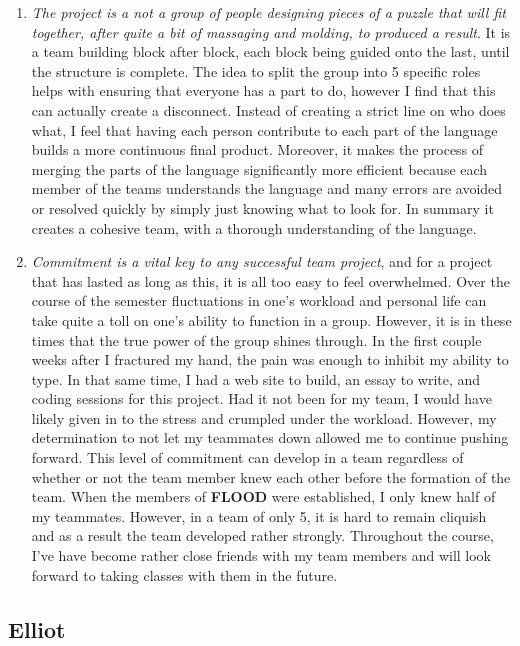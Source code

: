 \documentclass[12pt]{report}
\begin{document}
\begin{enumerate}
\item \textit{The project is a not a group of people designing pieces of a puzzle that will fit together, after quite a bit of massaging and molding, to produced a result}. It is a team building block after block, each block being guided onto the last, until the structure is complete. The idea to split the group into 5 specific roles helps with ensuring that everyone has a part to do, however I find that this can actually create a disconnect. Instead of creating a strict line on who does what, I feel that having each person contribute to each part of the language builds a more continuous final product. Moreover, it makes the process of merging the parts of the language significantly more efficient because each member of the teams understands the language and many errors are avoided or resolved quickly by simply just knowing what to look for. In summary it creates a cohesive team, with a thorough understanding of the language.
\item \textit{Commitment is a vital key to any successful team project}, and for a project that has lasted as long as this, it is all too easy to feel overwhelmed. Over the course of the semester fluctuations in one's workload and personal life can take quite a toll on one's ability to function in a group. However, it is in these times that the true power of the group shines through. In the first couple weeks after I fractured my hand, the pain was enough to inhibit my ability to type. In that same time, I had a web site to build, an essay to write, and coding sessions for this project. Had it not been for my team, I would have likely given in to the stress and crumpled under the workload. However, my determination to not let my teammates down allowed me to continue pushing forward. This level of commitment can develop in a team regardless of whether or not the team member knew each other before the formation of the team. When the members of \textbf{FLOOD} were established, I only knew half of my teammates. However, in a team of only 5, it is hard to remain cliquish and as a result the team developed rather strongly. Throughout the course, I've have become rather close friends with my team members and will look forward to taking classes with them in the future.
\end{enumerate}

\subsection{Elliot}
\end{document}

